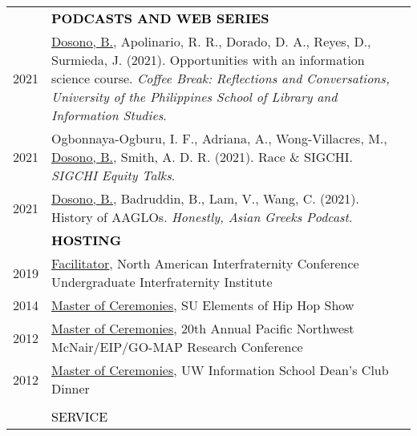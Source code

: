 \documentclass[11pt]{article}
\begin{document}
{{\begin{longtable}{Rp{0.75in}p{5.0in}}
\pagebreak

& \textcolor{black}{\uppercase{\textbf{Podcasts and Web Series}}}\\

\footnotesize{2021} &
\href{https://www.youtube.com/watch?v=CPGFnCFnm1s&ab_channel=UPSLIS}{{Dosono, B.}}, Apolinario, R. R., Dorado, D. A., Reyes, D., Surmieda, J. (2021). Opportunities with an information science course. \textit{Coffee Break: Reflections and Conversations, University of the Philippines School of Library and Information Studies}. \\

\footnotesize{2021} &
Ogbonnaya-Ogburu, I. F., Adriana, A., Wong-Villacres, M., \href{https://www.youtube.com/watch?v=n4El4VcPcVQ&list=PLqhXYFYmZ-VdgN7nr6KoCgtsT5x_Owr2Q&index=10&ab_channel=ACMSIGCHI}{{Dosono, B.}}, Smith, A. D. R. (2021). Race \& SIGCHI. \textit{SIGCHI Equity Talks}. \\

\footnotesize{2021} &
\href{https://anchor.fm/honestly-asian-greeks/episodes/Episode-1-History-of-AAGLOs-eok3em}{{Dosono, B.}}, Badruddin, B., Lam, V., Wang, C. (2021). History of AAGLOs. \textit{Honestly, Asian Greeks Podcast}. \\

& \textcolor{black}{\uppercase{\textbf{Hosting}}}\\

\footnotesize{2019} & \href{https://www.aflv.org/page/UIFI}{{Facilitator}}, North American Interfraternity Conference Undergraduate Interfraternity Institute\\

\footnotesize{2014} & \href{https://www.facebook.com/events/1495108147408350/}{{Master of Ceremonies}}, SU Elements of Hip Hop Show\\

\footnotesize{2012} & \href{https://www.washington.edu/omad/2012/05/14/undergraduates-to-present-research-at-20th-annual-pacific-northwest-mcnaireipgo-map-research-conference-may-17-19/}{{Master of Ceremonies}}, 20th Annual Pacific Northwest McNair/EIP/GO-MAP Research Conference\\

\footnotesize{2012} & \href{https://youtu.be/WMPhe6H7yiM}{{Master of Ceremonies}}, UW Information School Dean's Club Dinner\\
\\

\sout{\hfill} 
& \par \Large \textcolor{black}{\uppercase{Service\hspace{6pt} \sout{\hfill}}}\\


\end{longtable}}}
\end{document}
